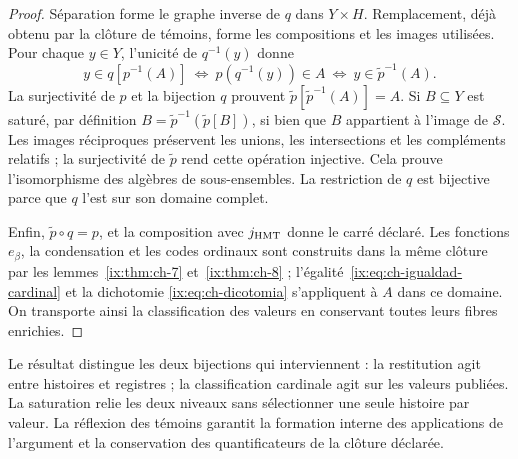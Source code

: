 \begin{proof}
Séparation forme le graphe inverse de \(q\) dans \(Y\times H\).
Remplacement, déjà obtenu par la clôture de témoins, forme les compositions
et les images utilisées. Pour chaque \(y\in Y\), l'unicité de
\(q^{-1}(y)\) donne
\[
 y\in q[p^{-1}(A)]
 \ \Longleftrightarrow\ p(q^{-1}(y))\in A
 \ \Longleftrightarrow\ y\in\widetilde p^{-1}(A).
\]
La surjectivité de \(p\) et la bijection \(q\) prouvent
\(\widetilde p[\widetilde p^{-1}(A)]=A\). Si \(B\subseteq Y\)
est saturé, par définition
\(B=\widetilde p^{-1}(\widetilde p[B])\), si bien que \(B\)
appartient à l'image de \(\mathcal S\). Les images réciproques préservent
les unions, les intersections et les compléments relatifs ; la surjectivité de
\(\widetilde p\) rend cette opération injective. Cela prouve
l'isomorphisme des algèbres de sous-ensembles. La restriction de \(q\) est
bijective parce que \(q\) l'est sur son domaine complet.

Enfin, \(\widetilde p\circ q=p\), et la composition avec
\(j_{\rm HMT}\) donne le carré déclaré. Les fonctions \(e_\beta\),
la condensation et les codes ordinaux sont construits dans la même
clôture par les lemmes~\ref{ix:thm:ch-7} et~\ref{ix:thm:ch-8} ;
l'égalité~\eqref{ix:eq:ch-igualdad-cardinal} et la dichotomie
\eqref{ix:eq:ch-dicotomia} s'appliquent à \(A\) dans ce domaine. On
transporte ainsi la classification des valeurs en conservant toutes leurs
fibres enrichies.
\end{proof}

Le résultat distingue les deux bijections qui interviennent : la restitution
agit entre histoires et registres ; la classification cardinale agit sur
les valeurs publiées. La saturation relie les deux niveaux sans
sélectionner une seule histoire par valeur. La réflexion des témoins garantit
la formation interne des applications de l'argument et la conservation des
quantificateurs de la clôture déclarée.
